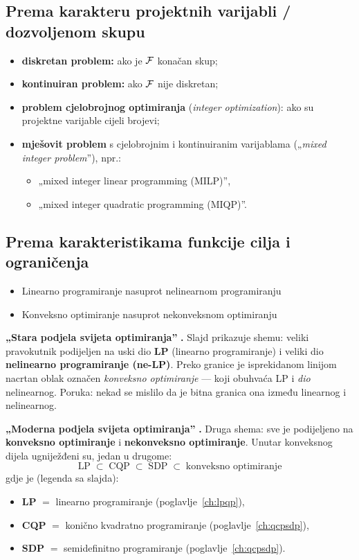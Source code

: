 \subsection{Prema karakteru projektnih varijabli / dozvoljenom skupu}

\begin{itemize}
  \item \textbf{diskretan problem:} ako je $\mathcal{F}$ konačan skup;
  \item \textbf{kontinuiran problem:} ako $\mathcal{F}$ nije diskretan;
  \item \textbf{problem cjelobrojnog optimiranja} (\emph{integer
        optimization}): ako su projektne varijable cijeli brojevi;
  \item \textbf{mješovit problem} s cjelobrojnim i kontinuiranim varijablama
        („\emph{mixed integer problem}”), npr.:
        \begin{itemize}
          \item „mixed integer linear programming (MILP)”,
          \item „mixed integer quadratic programming (MIQP)”.
        \end{itemize}
\end{itemize}

\subsection{Prema karakteristikama funkcije cilja i ograničenja}

\begin{itemize}
  \item Linearno programiranje nasuprot nelinearnom programiranju
  \item Konveksno optimiranje nasuprot nekonveksnom optimiranju
\end{itemize}

\textbf{„Stara podjela svijeta optimiranja”} \textbf{.} Slajd prikazuje
shemu: veliki pravokutnik podijeljen na uski dio \textbf{LP} (linearno
programiranje) i veliki dio \textbf{nelinearno programiranje (ne-LP)}. Preko
granice je isprekidanom linijom nacrtan oblak označen \emph{konveksno
optimiranje} --- koji obuhvaća LP i \emph{dio} nelinearnog. Poruka: nekad se
mislilo da je bitna granica ona između linearnog i nelinearnog.

\textbf{„Moderna podjela svijeta optimiranja”} \textbf{.}
Druga shema: sve je podijeljeno na \textbf{konveksno optimiranje} i
\textbf{nekonveksno optimiranje}. Unutar konveksnog dijela ugniježđeni su, jedan
u drugome:
\[
\text{LP} \;\subset\; \text{CQP} \;\subset\; \text{SDP} \;\subset\;
\text{konveksno optimiranje}
\]
gdje je (legenda sa slajda):
\begin{itemize}
  \item \textbf{LP} $=$ linearno programiranje (poglavlje~\ref{ch:lpqp}),
  \item \textbf{CQP} $=$ konično kvadratno programiranje
        (poglavlje~\ref{ch:qcpsdp}),
  \item \textbf{SDP} $=$ semidefinitno programiranje
        (poglavlje~\ref{ch:qcpsdp}).
\end{itemize}

